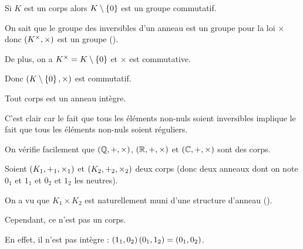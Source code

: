 \begin{prop}
Si \(K\) est un corps alors \(K\setminus\left\lbrace0\right\rbrace\) est un groupe commutatif.
\end{prop}

\begin{dem}
On sait que le groupe des inversibles d'un anneau est un groupe pour la loi \(\times\) donc \(\groupe{K\croix}[\times]\) est un groupe (\cf {}).

De plus, on a \(K^{\times}=K\setminus\left\lbrace0\right\rbrace\) et \(\times\) est commutative.

Donc \(\groupe{K\excluant\accol{0}}[\times]\) est commutatif.
\end{dem}

\begin{prop}
Tout corps est un anneau intègre.
\end{prop}

\begin{dem}
C'est clair car le fait que tous les éléments non-nuls soient inversibles implique le fait que tous les éléments non-nuls soient réguliers.
\end{dem}

\begin{ex}
On vérifie facilement que \(\corps{\Q}\), \(\corps{\R}\) et \(\corps{\C}\) sont des corps.
\end{ex}

\begin{ex}
Soient \(\corps{K_1}[+_1][\times_1]\) et \(\corps{K_2}[+_2][\times_2]\) deux corps (donc deux anneaux dont on note \(0_1\) et \(1_1\) et \(0_2\) et \(1_2\) les neutres).

On a vu que \(K_1\times K_2\) est naturellement muni d'une structure d'anneau (\cf {}).

Cependant, ce n'est pas un corps.

En effet, il n'est pas intègre : \(\left(1_1,0_2\right)\left(0_1,1_2\right)=\left(0_1,0_2\right)\).
\end{ex}

